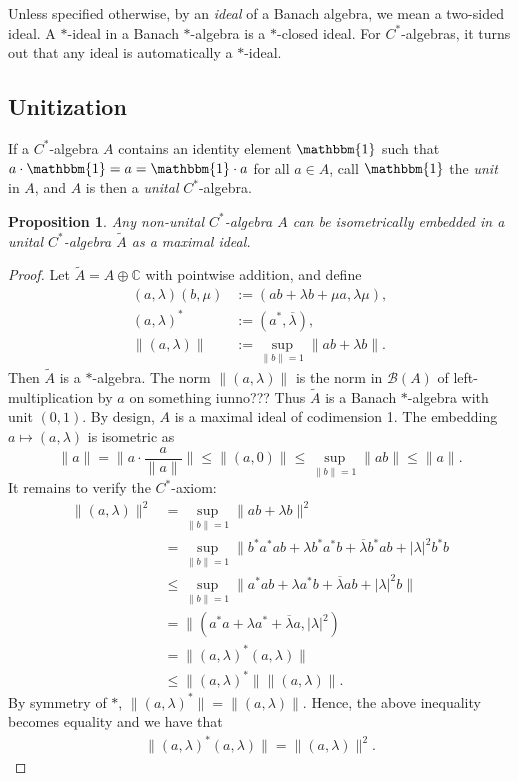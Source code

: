 \documentclass[12pt,a4paper]{amsart}
\theoremstyle{plain}
\newtheorem{prop}{Proposition}
\theoremstyle{definition}
\newcommand{\B}{\mathcal{B}}
\newcommand{\1}{\mathbbm{1}}
\newcommand{\C}{\mathbb{C}}
\begin{document}
Unless specified otherwise, by an \emph{ideal} of a Banach algebra, we mean a two-sided ideal.
A $\ast$-ideal in a Banach $\ast$-algebra is a $\ast$-closed ideal. 
For $C^\ast$-algebras, it turns out that any ideal is automatically a $\ast$-ideal.%

\subsection{Unitization}
If a $C^\ast$-algebra $A$ contains an identity element $\1$ such that 
$a\cdot \1 = a = \1 \cdot a$ for all $a \in A$, call $\1$ the \emph{unit} 
in $A$, and $A$ is then a \emph{unital} $C^\ast$-algebra.

\begin{prop}
	Any non-unital $C^\ast$-algebra $A$ can be isometrically embedded 
	in a unital $C^\ast$-algebra $\tilde{A}$ as a maximal ideal.
\end{prop}
\begin{proof}
	Let $\tilde{A} = A \oplus \C$ with pointwise addition, and define
	\begin{align*}
		(a,\lambda) (b,\mu) &:= (ab+\lambda b + \mu a, \lambda \mu),		\\
		(a,\lambda)^\ast &:= (a^\ast,\overline{\lambda}),					\\
		\|(a,\lambda)\| &:= \sup_{\|b\|=1}{\|ab+\lambda b\|}.
	\end{align*}
	Then $\tilde{A}$ is a $\ast$-algebra. The norm $\|(a,\lambda)\|$ is the norm 
	in $\B(A)$ of left-multiplication by $a$ on something iunno???
	Thus $\tilde{A}$ is a Banach $\ast$-algebra with unit $(0,1)$. 
	By design, $A$ is a maximal ideal of codimension 1. 
	The embedding $a\mapsto(a,\lambda)$ is isometric as 
	\[
		\|a\| = \|a\cdot\frac{a}{\|a\|}\| \leq \|(a,0)\| \leq \sup_{\|b\|=1}{\|ab\|} \leq \|a\|.
	\]
	It remains to verify the $C^\ast$-axiom:
	\begin{align*}
				\|(a,\lambda)\|^2 
		&=		\sup_{\|b\|=1}{\|ab+\lambda b\|^2}								\\
		&=		\sup_{\|b\|=1}{\|b^\ast a^\ast ab 
								+\lambda b^\ast a^\ast b
								+\overline{\lambda}b^\ast a b
								+|\lambda|^2 b^\ast b}							\\
		&\leq	\sup_{\|b\|=1}{\|a^\ast ab 
								+\lambda a^\ast b
								+\overline{\lambda}a b
								+|\lambda|^2 b\|}									\\
		&=		\|(a^\ast a + \lambda a^\ast +\overline{\lambda}a,|\lambda|^2)	\\
		&= 		\|(a,\lambda)^\ast(a,\lambda)\|									\\
		&\leq	\|(a,\lambda)^\ast\| \|(a,\lambda)\|.
	\end{align*}
	By symmetry of $\ast$, $\|(a,\lambda)^\ast\| = \|(a,\lambda)\|$. 
	Hence, the above inequality becomes equality and we have that
	\begin{align*}
		\|(a,\lambda)^\ast(a,\lambda)\| = \|(a,\lambda)\|^2. 
	\end{align*}		
	
\end{proof}
\end{document}
